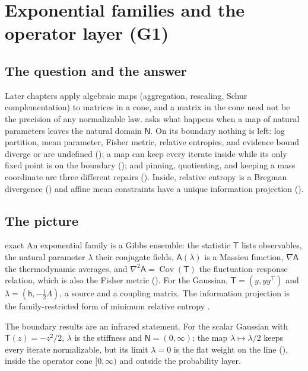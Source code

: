 \section{Exponential families and the operator layer (G1)}
\label{comp:sg1-expfamily}

\subsection{The question and the answer}

Later chapters apply algebraic maps (aggregation, rescaling, Schur complementation) to matrices in a
cone, and a matrix in the cone need not be the precision of any normalizable law.  asks
what happens when a map of natural parameters leaves the natural domain \(\mathsf N\). On its boundary
nothing is left: log partition, mean parameter, Fisher metric, relative entropies, and evidence bound
diverge or are undefined (); a map can keep every iterate inside
while its only fixed point is on the boundary (); and pinning,
quotienting, and keeping a mass coordinate are three different repairs (). Inside,
relative entropy is a Bregman divergence () and affine mean constraints have a
unique information projection ().

\subsection{The picture}

\begin{analogy}{exact}
An exponential family is a Gibbs ensemble: the statistic \(\mathsf T\) lists observables, the natural
parameter \(\lambda\) their conjugate fields, \(\mathsf A(\lambda)\) is a Massieu function,
\(\nabla\mathsf A\) the thermodynamic averages, and \(\nabla^2\mathsf A=\operatorname{Cov}(\mathsf T)\)
the fluctuation--response relation, which is also the Fisher metric (). For
the Gaussian, \(\mathsf T=(y,yy^\top)\) and \(\lambda=(\mathsf h,-\tfrac12\Lambda)\), a source and a
coupling matrix. The information projection is the family-restricted form of minimum relative entropy
\citep{jaynes2003probability}.
\end{analogy}

The boundary results are an infrared statement. For the scalar Gaussian with \(\mathsf T(z)=-z^2/2\),
\(\lambda\) is the stiffness and \(\mathsf N=(0,\infty)\); the map \(\lambda\mapsto\lambda/2\) keeps
every iterate normalizable, but its limit \(\lambda=0\) is the flat weight on the line
(), inside the operator cone \([0,\infty)\) and outside the probability
layer.

